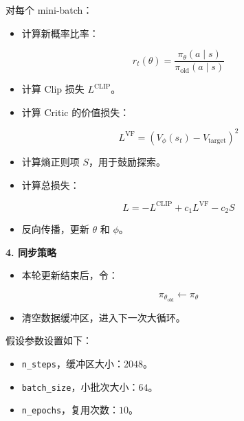 对每个 mini-batch：

\begin{itemize}
\tightlist
\item
  计算新概率比率：
\end{itemize}

\[
r_t(\theta)=\frac{\pi_\theta(a\mid s)}{\pi_{\mathrm{old}}(a\mid s)}
\]

\begin{itemize}
\tightlist
\item
  计算 Clip 损失 \(L^{\mathrm{CLIP}}\)。
\item
  计算 Critic 的价值损失：
\end{itemize}

\[
L^{\mathrm{VF}}=\left(V_\phi(s_t)-V_{\mathrm{target}}\right)^{2}
\]

\begin{itemize}
\tightlist
\item
  计算熵正则项 \(S\)，用于鼓励探索。
\item
  计算总损失：
\end{itemize}

\[
L=-L^{\mathrm{CLIP}}+c_1L^{\mathrm{VF}}-c_2S
\]

\begin{itemize}
\tightlist
\item
  反向传播，更新 \(\theta\) 和 \(\phi\)。
\end{itemize}

\textbf{4. 同步策略}

\begin{itemize}
\tightlist
\item
  本轮更新结束后，令：
\end{itemize}

\[
\pi_{\theta_{\mathrm{old}}}\leftarrow\pi_\theta
\]

\begin{itemize}
\tightlist
\item
  清空数据缓冲区，进入下一次大循环。
\end{itemize}

假设参数设置如下：

\begin{itemize}
\tightlist
\item
  \texttt{n\_steps}，缓冲区大小：\(2048\)。
\item
  \texttt{batch\_size}，小批次大小：\(64\)。
\item
  \texttt{n\_epochs}，复用次数：\(10\)。
\end{itemize}

